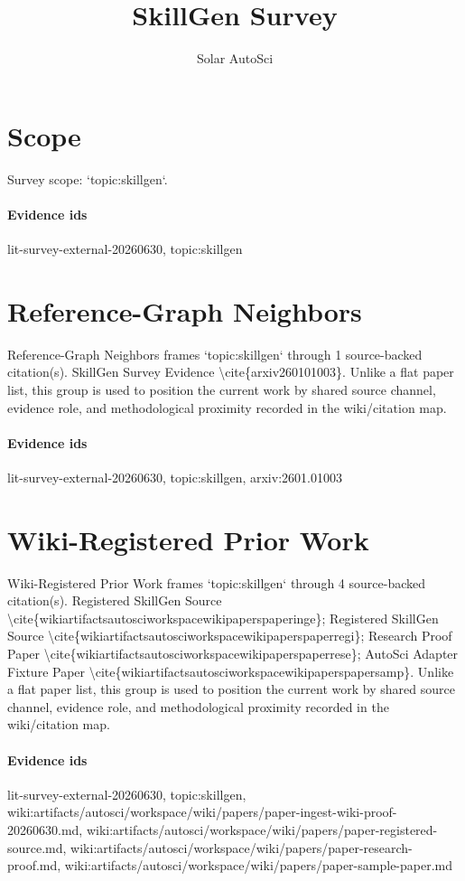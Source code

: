 \documentclass{article}
\title{SkillGen Survey}
\author{Solar AutoSci}
\date{}
\begin{document}
\maketitle

\section{Scope}
Survey scope: `topic:skillgen`.

\paragraph{Evidence ids} lit-survey-external-20260630, topic:skillgen

\section{Reference-Graph Neighbors}
Reference-Graph Neighbors frames `topic:skillgen` through 1 source-backed citation(s). SkillGen Survey Evidence \textbackslash{}cite\{arxiv260101003\}. Unlike a flat paper list, this group is used to position the current work by shared source channel, evidence role, and methodological proximity recorded in the wiki/citation map.

\paragraph{Evidence ids} lit-survey-external-20260630, topic:skillgen, arxiv:2601.01003

\section{Wiki-Registered Prior Work}
Wiki-Registered Prior Work frames `topic:skillgen` through 4 source-backed citation(s). Registered SkillGen Source \textbackslash{}cite\{wikiartifactsautosciworkspacewikipaperspaperinge\}; Registered SkillGen Source \textbackslash{}cite\{wikiartifactsautosciworkspacewikipaperspaperregi\}; Research Proof Paper \textbackslash{}cite\{wikiartifactsautosciworkspacewikipaperspaperrese\}; AutoSci Adapter Fixture Paper \textbackslash{}cite\{wikiartifactsautosciworkspacewikipaperspapersamp\}. Unlike a flat paper list, this group is used to position the current work by shared source channel, evidence role, and methodological proximity recorded in the wiki/citation map.

\paragraph{Evidence ids} lit-survey-external-20260630, topic:skillgen, wiki:artifacts/autosci/workspace/wiki/papers/paper-ingest-wiki-proof-20260630.md, wiki:artifacts/autosci/workspace/wiki/papers/paper-registered-source.md, wiki:artifacts/autosci/workspace/wiki/papers/paper-research-proof.md, wiki:artifacts/autosci/workspace/wiki/papers/paper-sample-paper.md
\end{document}
